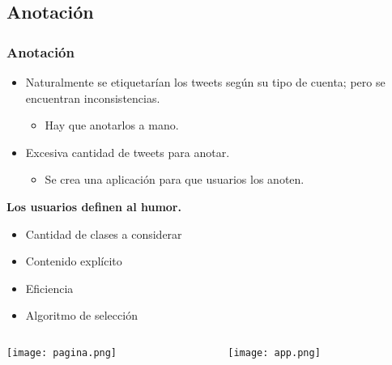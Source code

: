 \subsection{Anotación}
\begin{frame}[allowframebreaks]
    \frametitle{Anotación}

    \begin{itemize}
        \item Naturalmente se etiquetarían los tweets según su tipo de cuenta; pero se encuentran inconsistencias.

        \begin{itemize}
            \item Hay que anotarlos a mano.
        \end{itemize}

        \item Excesiva cantidad de tweets para anotar.

        \begin{itemize}
            \item Se crea una aplicación para que usuarios los anoten.
        \end{itemize}
    \end{itemize}

    \vspace{1cm}

    \begin{center}
        \bf
        Los usuarios definen al humor.
    \end{center}

    \framebreak

    \begin{itemize}
        \item Cantidad de clases a considerar
        \item Contenido explícito
        \item Eficiencia
        \item Algoritmo de selección
    \end{itemize}

    \framebreak

    \begin{center}
        \begin{columns}[c]
            \begin{column}[c]{0.45\textwidth}
                \centering
                \texttt{[image: pagina.png]}
            \end{column}

            \begin{column}[c]{0.45\textwidth}
                \centering
                \texttt{[image: app.png]}
            \end{column}
        \end{columns}
    \end{center}
\end{frame}

